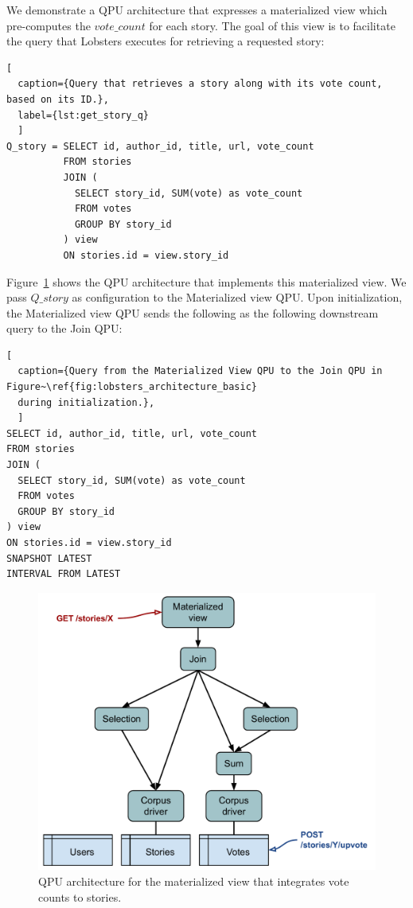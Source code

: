 \noindent
We demonstrate a QPU architecture that expresses a materialized view which pre-computes the $vote\_count$ for each story.
The goal of this view is to facilitate the query that Lobsters executes for retrieving a requested story:

\begin{lstlisting}[
  caption={Query that retrieves a story along with its vote count, based on its ID.},
  label={lst:get_story_q}
  ]
Q_story = SELECT id, author_id, title, url, vote_count
          FROM stories
          JOIN (
            SELECT story_id, SUM(vote) as vote_count
            FROM votes
            GROUP BY story_id
          ) view
          ON stories.id = view.story_id
\end{lstlisting}

\noindent
Figure~\ref{fig:lobsters_architecture_basic} shows the QPU architecture that implements this materialized view.
We pass $Q\_story$ as configuration to the Materialized view QPU.
Upon initialization, the Materialized view QPU sends the following as the following downstream query to the Join QPU:


\begin{lstlisting}[
  caption={Query from the Materialized View QPU to the Join QPU in Figure~\ref{fig:lobsters_architecture_basic}
  during initialization.},
  ]
SELECT id, author_id, title, url, vote_count
FROM stories
JOIN (
  SELECT story_id, SUM(vote) as vote_count
  FROM votes
  GROUP BY story_id
) view
ON stories.id = view.story_id
SNAPSHOT LATEST
INTERVAL FROM LATEST
\end{lstlisting}

\begin{figure}[t]
  \centering
    \includegraphics[scale=0.5]{./figures/case_studies/lobsters_architecture_basic.pdf}
  \caption{QPU architecture for the materialized view that integrates vote counts to stories.}
  \label{fig:lobsters_architecture_basic}
\end{figure}

